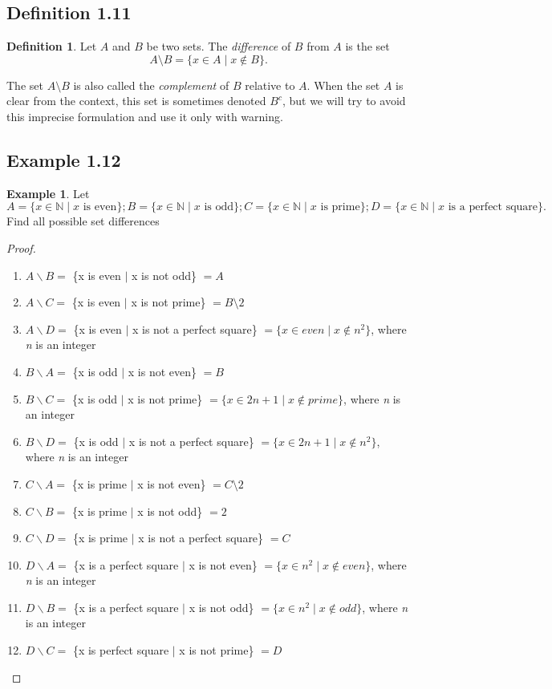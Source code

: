 \documentclass[openany, amssymb, psamsfonts]{amsart}
\newcommand{\bbN}{\mathbb{N}}
\theoremstyle{definition}
\newtheorem{defn}{Definition}[section]
\newtheorem{exmp}{Example}[section]
\numberwithin{equation}{section}
\begin{document}
\subsection{Definition 1.11}
\begin{defn}  
Let $A$ and $B$ be two sets. 
The \emph{difference} of $B$ from $A$ is the set
\[
A \setminus B = \{ x \in A \mid x \notin B \}.
\]
\end{defn}

The set $A \setminus B$ is also called the \emph{complement} of $B$ relative to $A$.
When the set $A$ is clear from the context, this set is sometimes denoted $B^{c}$, but we will 
try to avoid this imprecise formulation and use it only with warning.
\subsection{Example 1.12}

\begin{exmp}
Let $A=\{x\in\bbN\mid x\text{ is even}\}; B=\{x\in\bbN\mid x\text{ is odd}\}; C=\{x\in\bbN\mid x\text{ is prime}\}; D=\{x\in\bbN\mid x\text{ is a perfect square}\}.$
Find all possible set differences
\begin{proof}
\begin{enumerate} [1]
\item $A \backslash B =$ \{x is even $\mid$ x is not odd\} $= A$ 
\item $A \backslash C =$ \{x is even $\mid$ x is not prime\} $= B \setminus 2$ 
\item $A \backslash D =$ \{x is even $\mid$ x is not a perfect square\} $= \{x\in even \mid x\notin n^2\}$, where \emph{n} is an integer
\item$B \backslash A =$ \{x is odd $\mid$ x is not even\} $= B$ 
\item$B \backslash C =$ \{x is odd $\mid$ x is not prime\} $= \{x\in 2n+1 \mid x\notin prime\}$, where \emph{n} is an integer
\item $B \backslash D =$ \{x is odd $\mid$ x is not a perfect square\} $= \{x\in 2n+1 \mid x\notin n^2\}$, where \emph{n} is an integer
\item $C \backslash A =$ \{x is prime $\mid$ x is not even\} $= C \setminus 2$ 
\item $C \backslash B =$ \{x is prime $\mid$ x is not odd\} $= 2$ 
\item $C \backslash D =$ \{x is prime $\mid$ x is not a perfect square\} $= C$
\item $D \backslash A =$ \{x is a perfect square $\mid$ x is not even\} $=  \{x\in n^2 \mid x\notin even\}$, where \emph{n} is an integer
\item $D \backslash B =$ \{x is a perfect square $\mid$ x is not odd\} $= \{x\in n^2 \mid x\notin odd\}$, where \emph{n} is an integer
\item $D \backslash C =$ \{x is perfect square $\mid$ x is not prime\} $= D$ 
    \end{enumerate}
\end{proof}
\end{exmp} 
\end{document}
